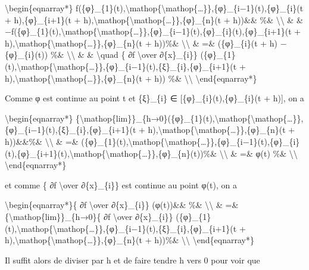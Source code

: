 \textbackslash{}begin\{eqnarray*\}
f(\{φ\}\_\{1\}(t),\textbackslash{}mathop\{\textbackslash{}mathop\{\ldots{}\}\},\{φ\}\_\{i−1\}(t),\{φ\}\_\{i\}(t
+ h),\{φ\}\_\{i+1\}(t +
h),\textbackslash{}mathop\{\textbackslash{}mathop\{\ldots{}\}\},\{φ\}\_\{n\}(t
+ h))\&\& \%\& \textbackslash{}\textbackslash{} \& \&
−f(\{φ\}\_\{1\}(t),\textbackslash{}mathop\{\textbackslash{}mathop\{\ldots{}\}\},\{φ\}\_\{i−1\}(t),\{φ\}\_\{i\}(t),\{φ\}\_\{i+1\}(t
+
h),\textbackslash{}mathop\{\textbackslash{}mathop\{\ldots{}\}\},\{φ\}\_\{n\}(t
+ h))\%\& \textbackslash{}\textbackslash{} \& =\& (\{φ\}\_\{i\}(t + h) −
\{φ\}\_\{i\}(t)) \%\& \textbackslash{}\textbackslash{} \& \&
\textbackslash{}quad \{ ∂f \textbackslash{}over ∂\{x\}\_\{i\}\}
(\{φ\}\_\{1\}(t),\textbackslash{}mathop\{\textbackslash{}mathop\{\ldots{}\}\},\{φ\}\_\{i−1\}(t),\{ξ\}\_\{i\},\{φ\}\_\{i+1\}(t
+
h),\textbackslash{}mathop\{\textbackslash{}mathop\{\ldots{}\}\},\{φ\}\_\{n\}(t
+ h)) \%\& \textbackslash{}\textbackslash{}
\textbackslash{}end\{eqnarray*\}

Comme φ est continue au point t et \{ξ\}\_\{i\} ∈
{[}\{φ\}\_\{i\}(t),\{φ\}\_\{i\}(t + h){]}, on a

\textbackslash{}begin\{eqnarray*\}
\{\textbackslash{}mathop\{lim\}\}\_\{h→0\}(\{φ\}\_\{1\}(t),\textbackslash{}mathop\{\textbackslash{}mathop\{\ldots{}\}\},\{φ\}\_\{i−1\}(t),\{ξ\}\_\{i\},\{φ\}\_\{i+1\}(t
+
h),\textbackslash{}mathop\{\textbackslash{}mathop\{\ldots{}\}\},\{φ\}\_\{n\}(t
+ h))\&\&\%\& \textbackslash{}\textbackslash{} \& =\&
(\{φ\}\_\{1\}(t),\textbackslash{}mathop\{\textbackslash{}mathop\{\ldots{}\}\},\{φ\}\_\{i−1\}(t),\{φ\}\_\{i\}(t),\{φ\}\_\{i+1\}(t),\textbackslash{}mathop\{\textbackslash{}mathop\{\ldots{}\}\},\{φ\}\_\{n\}(t))\%\&
\textbackslash{}\textbackslash{} \& =\& φ(t) \%\&
\textbackslash{}\textbackslash{} \textbackslash{}end\{eqnarray*\}

et comme \{ ∂f \textbackslash{}over ∂\{x\}\_\{i\}\} est continue au
point φ(t), on a

\textbackslash{}begin\{eqnarray*\}\{ ∂f \textbackslash{}over
∂\{x\}\_\{i\}\} (φ(t))\&\& \%\& \textbackslash{}\textbackslash{} \& =\&
\{\textbackslash{}mathop\{lim\}\}\_\{h→0\}\{ ∂f \textbackslash{}over
∂\{x\}\_\{i\}\}
(\{φ\}\_\{1\}(t),\textbackslash{}mathop\{\textbackslash{}mathop\{\ldots{}\}\},\{φ\}\_\{i−1\}(t),\{ξ\}\_\{i\},\{φ\}\_\{i+1\}(t
+
h),\textbackslash{}mathop\{\textbackslash{}mathop\{\ldots{}\}\},\{φ\}\_\{n\}(t
+ h))\%\& \textbackslash{}\textbackslash{}
\textbackslash{}end\{eqnarray*\}

Il suffit alors de diviser par h et de faire tendre h vers 0 pour voir
que

